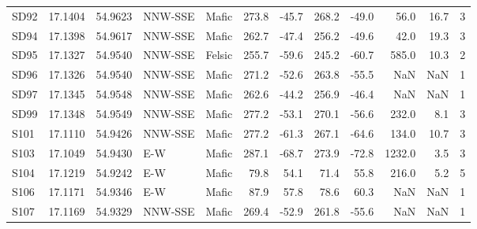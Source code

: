 \begin{tabular}{lrrllrrrrrrr}
SD92 & 17.1404 & 54.9623 &     NNW-SSE &  Mafic  &        273.8 &        -45.7 &       268.2 &       -49.0 &    56.0 &         16.7 &                3 \\
SD94 & 17.1398 & 54.9617 &     NNW-SSE &  Mafic  &        262.7 &        -47.4 &       256.2 &       -49.6 &    42.0 &         19.3 &                3 \\
SD95 & 17.1327 & 54.9540 &     NNW-SSE & Felsic  &        255.7 &        -59.6 &       245.2 &       -60.7 &   585.0 &         10.3 &                2 \\
SD96 & 17.1326 & 54.9540 &     NNW-SSE &  Mafic  &        271.2 &        -52.6 &       263.8 &       -55.5 &     NaN &          NaN &                1 \\
SD97 & 17.1345 & 54.9548 &     NNW-SSE &  Mafic  &        262.6 &        -44.2 &       256.9 &       -46.4 &     NaN &          NaN &                1 \\
SD99 & 17.1348 & 54.9549 &     NNW-SSE &  Mafic  &        277.2 &        -53.1 &       270.1 &       -56.6 &   232.0 &          8.1 &                3 \\
S101 & 17.1110 & 54.9426 &     NNW-SSE &  Mafic  &        277.2 &        -61.3 &       267.1 &       -64.6 &   134.0 &         10.7 &                3 \\
S103 & 17.1049 & 54.9430 &         E-W &  Mafic  &        287.1 &        -68.7 &       273.9 &       -72.8 &  1232.0 &          3.5 &                3 \\
S104 & 17.1219 & 54.9242 &         E-W &  Mafic  &         79.8 &         54.1 &        71.4 &        55.8 &   216.0 &          5.2 &                5 \\
S106 & 17.1171 & 54.9346 &         E-W &  Mafic  &         87.9 &         57.8 &        78.6 &        60.3 &     NaN &          NaN &                1 \\
S107 & 17.1169 & 54.9329 &     NNW-SSE &  Mafic  &        269.4 &        -52.9 &       261.8 &       -55.6 &     NaN &          NaN &                1 \\
\bottomrule
\end{tabular}

\normalsize